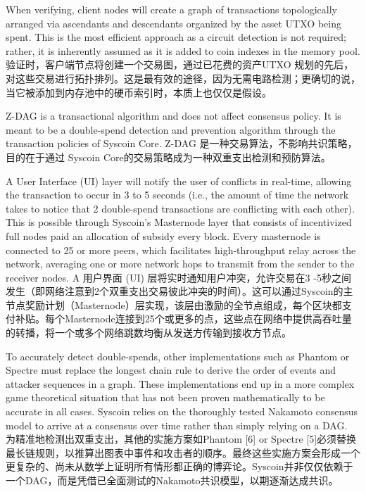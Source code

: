\documentclass{ctexart}
\begin{document}
When verifying, client nodes will create a graph of transactions topologically arranged via ascendants and descendants organized by the asset UTXO being spent. This is the most efficient approach as a circuit detection is not required; rather, it is inherently assumed as it is added to coin indexes in the memory pool. 验证时，客户端节点将创建一个交易图，通过已花费的资产UTXO 规划的先后，对这些交易进行拓扑排列。这是最有效的途径，因为无需电路检测；更确切的说，当它被添加到内存池中的硬币索引时，本质上也仅仅是假设。

Z-DAG is a transactional algorithm and does not affect consensus policy. It is meant to be a double-spend detection and prevention algorithm through the transaction policies of Syscoin Core. Z-DAG 是一种交易算法，不影响共识策略，目的在于通过 Syscoin Core的交易策略成为一种双重支出检测和预防算法。

A User Interface (UI) layer will notify the user of conflicts in real-time, allowing the transaction to occur in 3 to 5 seconds (i.e., the amount of time the network takes to notice that 2 double-spend transactions are conflicting with each other). This is possible through Syscoin’s Masternode layer that consists of incentivized full nodes paid an allocation of subsidy every block. Every masternode is connected to 25 or more peers, which facilitates high-throughput relay across the network, averaging one or more network hops to transmit from the sender to the receiver nodes. A 用户界面 (UI) 层将实时通知用户冲突，允许交易在3 -5秒之间发生（即网络注意到2个双重支出交易彼此冲突的时间）。这可以通过Syscoin的主节点奖励计划（Masternode）层实现，该层由激励的全节点组成，每个区块都支付补贴。每个Masternode连接到25个或更多的点，这些点在网络中提供高吞吐量的转播，将一个或多个网络跳数均衡从发送方传输到接收方节点。

To accurately detect double-spends, other implementations such as Phantom \cite{Som18} or Spectre \cite{Som15} must replace the longest chain rule to derive the order of events and attacker sequences in a graph.
These implementations end up in a more complex game theoretical situation that has not  been proven mathematically to be accurate in all cases. Syscoin relies on the thoroughly tested Nakamoto consensus model to arrive at a consensus over time rather than simply relying on a DAG. 为精准地检测出双重支出，其他的实施方案如Phantom [6] or Spectre [5]必须替换最长链规则，以推算出图表中事件和攻击者的顺序。最终这些实施方案会形成一个更复杂的、尚未从数学上证明所有情形都正确的博弈论。Syscoin并非仅仅依赖于一个DAG，而是凭借已全面测试的Nakamoto共识模型，以期逐渐达成共识。
\end{document}
